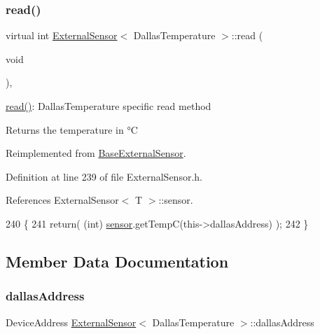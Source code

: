\subsubsection{\texorpdfstring{read()}{read()}}
{\footnotesize\ttfamily virtual int \hyperlink{classExternalSensor}{External\+Sensor}$<$ Dallas\+Temperature $>$\+::read (\begin{DoxyParamCaption}\item[{void}]{ }\end{DoxyParamCaption})\hspace{0.3cm}{\ttfamily [inline]}, {\ttfamily [virtual]}}

\hyperlink{classExternalSensor_3_01DallasTemperature_01_4_a127ead06440ec972c22db2abeb8e2b51}{read()}\+: Dallas\+Temperature specific read method

\begin{DoxyReturn}{Returns}
the temperature in °C 
\end{DoxyReturn}


Reimplemented from \hyperlink{classBaseExternalSensor_a7e0a98f350148d7645031315657aa5ec}{Base\+External\+Sensor}.



Definition at line 239 of file External\+Sensor.\+h.



References External\+Sensor$<$ T $>$\+::sensor.


\begin{DoxyCode}
240     \{
241          \textcolor{keywordflow}{return}( (\textcolor{keywordtype}{int}) \hyperlink{classExternalSensor_3_01DallasTemperature_01_4_adb6ba4fcdedef95ad8f6b0c9b6c0f9d1}{sensor}.getTempC(this->dallasAddress) );
242     \}
\end{DoxyCode}


\subsection{Member Data Documentation}
\mbox{\label{classExternalSensor_3_01DallasTemperature_01_4_a7d9e9d2893e453638fcf440e5d8d9082}} 
\subsubsection{\texorpdfstring{dallas\+Address}{dallasAddress}}
{\footnotesize\ttfamily Device\+Address \hyperlink{classExternalSensor}{External\+Sensor}$<$ Dallas\+Temperature $>$\+::dallas\+Address\hspace{0.3cm}{\ttfamily [private]}}



